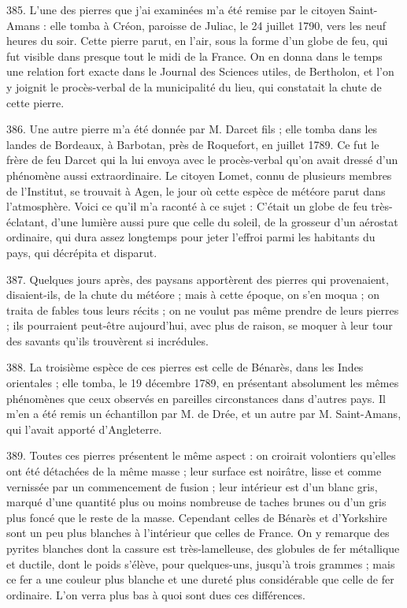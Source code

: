 \documentclass[a4paper, 11pt, oneside, polutonikogreek, french]{article}
\begin{document}
385. L'une des pierres que j'ai examinées m'a été remise par le citoyen Saint-Amans : elle tomba à Créon, paroisse de Juliac, le 24 juillet 1790, vers les neuf heures du soir. Cette pierre parut, en l'air, sous la forme d'un globe de feu, qui fut visible dans presque tout le midi de la France. On en donna dans le temps une relation fort exacte dans le Journal des Sciences utiles, de Bertholon, et l'on y joignit le procès-verbal de la municipalité du lieu, qui constatait la chute de cette pierre.

386. Une autre pierre m'a été donnée par M. Darcet fils ; elle tomba dans les landes de Bordeaux, à Barbotan, près de Roquefort, en juillet 1789. Ce fut le frère de feu Darcet qui la lui envoya avec le procès-verbal qu'on avait dressé d'un phénomène aussi extraordinaire. Le citoyen Lomet, connu de plusieurs membres de l'Institut, se trouvait à Agen, le jour où cette espèce de météore parut dans l'atmosphère. Voici ce qu'il m'a raconté à ce sujet : \og C'était un globe de feu très-éclatant, d'une lumière aussi pure que celle du soleil, de la grosseur d'un aérostat ordinaire, qui dura assez longtemps pour jeter l'effroi parmi les habitants du pays, qui décrépita et disparut. \fg

387. Quelques jours après, des paysans apportèrent des pierres qui provenaient, disaient-ils, de la chute du météore ; mais à cette époque, on s'en moqua ; on traita de fables tous leurs récits ; on ne voulut pas même prendre de leurs pierres ; ils pourraient peut-être aujourd'hui, avec plus de raison, se moquer à leur tour des savants qu'ils trouvèrent si incrédules.

388. La troisième espèce de ces pierres est celle de Bénarès, dans les Indes orientales ; elle tomba, le 19 décembre 1789, en présentant absolument les mêmes phénomènes que ceux observés en pareilles circonstances dans d'autres pays. Il m'en a été remis un échantillon par M. de Drée, et un autre par M. Saint-Amans, qui l'avait apporté d'Angleterre.

389. Toutes ces pierres présentent le même aspect : on croirait volontiers qu'elles ont été détachées de la même masse ; leur surface est noirâtre, lisse et comme vernissée par un commencement de fusion ; leur intérieur est d'un blanc gris, marqué d'une quantité plus ou moins nombreuse de taches brunes ou d'un gris plus foncé que le reste de la masse. Cependant celles de Bénarès et d'Yorkshire sont un peu plus blanches à l'intérieur que celles de France. On y remarque des pyrites blanches dont la cassure est très-lamelleuse, des globules de fer métallique et ductile, dont le poids s'élève, pour quelques-uns, jusqu'à trois grammes ; mais ce fer a une couleur plus blanche et une dureté plus considérable que celle de fer ordinaire. L'on verra plus bas à quoi sont dues ces différences.
\end{document}
